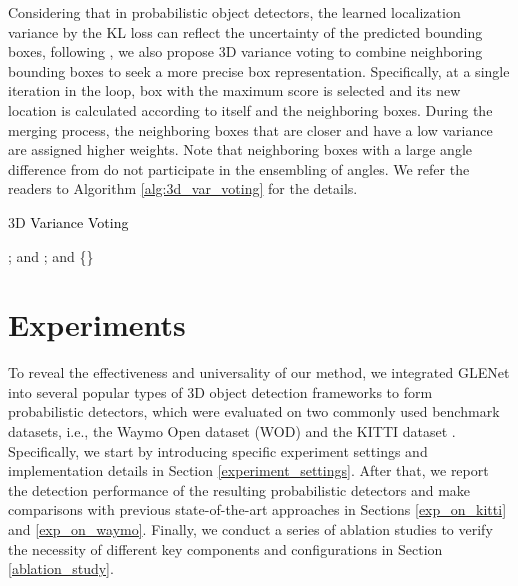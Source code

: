 \documentclass[twocolumn]{svjour3}
\newcommand{\revise}[1]{\textcolor{black}{#1}}
\begin{document}
Considering that in probabilistic object detectors, the learned localization variance by the KL loss can reflect the uncertainty of the predicted bounding boxes, following \citep{bbr}, we also propose 3D variance voting to combine neighboring bounding boxes to seek a more precise box representation. Specifically, at a single iteration in the loop, box  with the maximum score is selected and its new location is calculated according to itself and the neighboring boxes.
During the merging process, the neighboring boxes that are closer and have a low variance are assigned higher weights. 
Note that neighboring boxes with a large angle difference from  do not participate in the ensembling of angles. We refer the readers to Algorithm \ref{alg:3d_var_voting} for the details.
\begin{algorithm}[t]
\SetAlgoLined
\caption{3D \revise{Variance Voting}}\label{alg:3d_var_voting}
; and \;
; and \;
 \{\}\;
\;
\end{algorithm}

\vspace{-0.5cm}
\section{Experiments} \label{experiments}

To reveal the effectiveness and universality of our method, we integrated GLENet into several popular types of 3D object detection frameworks to form probabilistic detectors, which were evaluated on two commonly used benchmark datasets, i.e., the Waymo Open dataset (WOD) \citep{Sun_2020_CVPR} and the KITTI dataset \citep{Geiger_KITTI}. Specifically, we start by introducing specific experiment settings and implementation details in Section \ref{experiment_settings}. After that, we report the detection performance of the resulting probabilistic detectors and make comparisons with previous state-of-the-art approaches in Sections \ref{exp_on_kitti} and \ref{exp_on_waymo}. Finally, we conduct a series of ablation studies to verify the necessity of different key components and configurations in Section \ref{ablation_study}.
\end{document}
